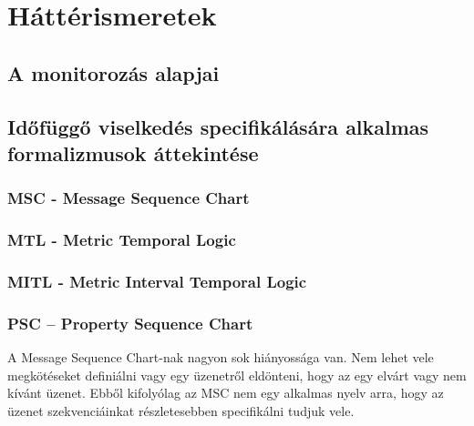 \chapter{Háttérismeretek}\section{A monitorozás alapjai}

\clearpage\section{Időfüggő viselkedés specifikálására alkalmas formalizmusok áttekintése}
\subsection{MSC - Message Sequence Chart}
\subsection{MTL - Metric Temporal Logic}
\subsection{MITL - Metric Interval Temporal Logic}
\subsection{PSC – Property Sequence Chart}
A Message Sequence Chart-nak nagyon sok hiányossága van.
Nem lehet vele megkötéseket definiálni vagy egy üzenetről eldönteni, hogy az egy elvárt vagy nem kívánt üzenet.
Ebből kifolyólag az MSC nem egy alkalmas nyelv arra, hogy az üzenet szekvenciáinkat részletesebben specifikálni tudjuk vele.

